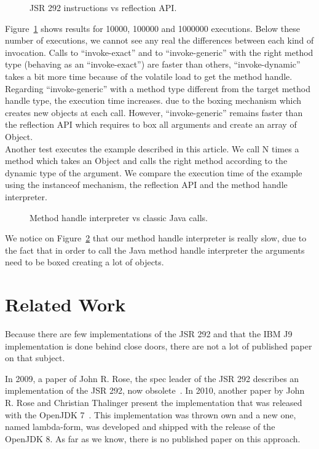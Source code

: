 \documentclass{sig-alternate}
\def \Jsr{JSR\xspace}
\def \JSR{\Jsr 292\xspace}
\begin{document}
  \begin{figure}[!ht]
    \resizebox{\linewidth}{!}{}
    \caption{JSR 292 instructions vs reflection API.}
    \label{Rinvoke}
  \end{figure}

  Figure~\ref{Rinvoke} shows results for 10000, 100000 and 1000000 executions.
  Below these number of executions, we cannot see any real the differences between each kind of invocation.
  Calls to ``invoke-exact'' and to ``invoke-generic'' with the right method type (behaving as an ``invoke-exact'') are faster than others,
  ``invoke-dynamic'' takes a bit more time because of the volatile load to get the method handle.
  Regarding ``invoke-generic'' with a method type different from the target method handle type, the execution time increases.
  due to the boxing mechanism which creates new objects at each call.
  However, ``invoke-generic'' remains faster than the reflection API which requires to box all arguments and create an array of Object.\\
  
  Another test executes the example described in this article.
  We call N times a method which takes an Object and calls the right method according to the dynamic type of the argument.
  We compare the execution time of the example using the instanceof mechanism, the reflection API and the method handle interpreter.

  \begin{figure}[!ht]
    \resizebox{\linewidth}{!}{}
    \caption{Method handle interpreter vs classic Java calls.}\vspace{-1em}
    \label{Rmutable}
  \end{figure}

  We notice on Figure~\ref{Rmutable} that our method handle interpreter is really slow,
  due to the fact that in order to call the Java method handle interpreter the arguments need to be boxed creating a lot of objects.

\section{Related Work}
  Because there are few implementations of the \JSR and that the IBM J9 implementation is done behind close doors,
  there are not a lot of published paper on that subject.

  In 2009, a paper of John R. Rose, the spec leader of the \JSR describes an implementation of the \JSR,
  now obsolete~\cite{vmil-rose-indy-2009}. In 2010, another paper by John R. Rose and Christian Thalinger present the implementation
  that was released with the OpenJDK 7~\cite{pppj-rose-indy-2010}. This implementation was thrown own and a new one, named lambda-form,
  was developed and shipped with the release of the OpenJDK 8. As far as we know, there is no published paper on this approach.
\end{document}
